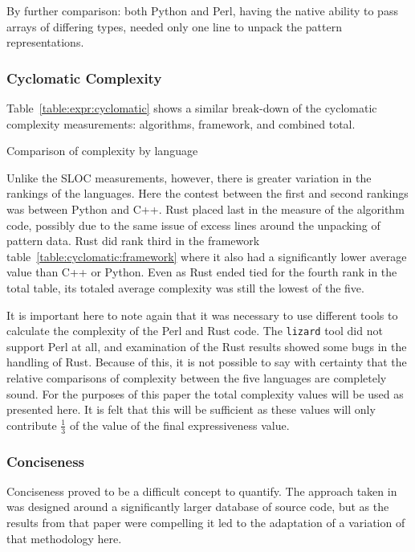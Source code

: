 By further comparison: both Python and Perl, having the native ability to pass arrays of differing types, needed only one line to unpack the pattern representations.

\subsubsection{Cyclomatic Complexity}

Table~\ref{table:expr:cyclomatic} shows a similar break-down of the cyclomatic complexity measurements: algorithms, framework, and combined total.

\begin{table}[!htb]

\caption{Comparison of complexity by language}
\label{table:expr:cyclomatic}
\end{table}

Unlike the SLOC measurements, however, there is greater variation in the rankings of the languages. Here the contest between the first and second rankings was between Python and C++. Rust placed last in the measure of the algorithm code, possibly due to the same issue of excess lines around the unpacking of pattern data. Rust did rank third in the framework table~\ref{table:cyclomatic:framework} where it also had a significantly lower average value than C++ or Python. Even as Rust ended tied for the fourth rank in the total table, its totaled average complexity was still the lowest of the five.

It is important here to note again that it was necessary to use different tools to calculate the complexity of the Perl and Rust code. The \texttt{lizard} tool did not support Perl at all, and examination of the Rust results showed some bugs in the handling of Rust. Because of this, it is not possible to say with certainty that the relative comparisons of complexity between the five languages are completely sound. For the purposes of this paper the total complexity values will be used as presented here. It is felt that this will be sufficient as these values will only contribute $\frac{1}{3}$ of the value of the final expressiveness value.

\subsubsection{Conciseness}
\label{subsubsec:conciseness}

Conciseness proved to be a difficult concept to quantify. The approach taken in~\cite{bergmans} was designed around a significantly larger database of source code, but as the results from that paper were compelling it led to the adaptation of a variation of that methodology here.

